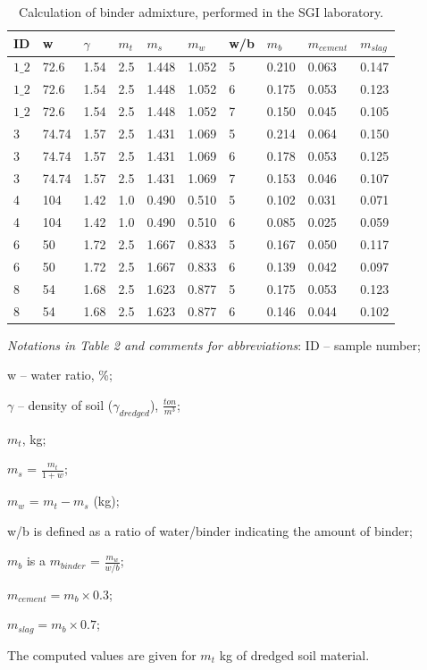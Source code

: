 \documentclass[information,article,submit,pdftex,moreauthors]{Definitions/mdpi}
\begin{document}
\begin{table}[H] 
\begin{threeparttable}
\caption{Calculation of binder admixture, performed in the SGI laboratory.\label{tab02}}
\begin{tabularx}{\textwidth}{CCCCCCCCCC}
\toprule
\textbf{ID} & \textbf{w} & \textbf{$\gamma$} & \textbf{$m_t$} & \textbf{$m_s$} & \textbf{$m_w$} & \textbf{w/b} & \textbf{$m_b$} & \textbf{$m_{cement}$} & \textbf{$m_{slag}$} \\
\midrule
$1\_2$ & 72.6 & 1.54 & 2.5 & 1.448 & 1.052 & 5 & 0.210 & 0.063 & 0.147\\
$1\_2$ & 72.6 & 1.54 & 2.5 & 1.448 & 1.052 & 6 & 0.175 & 0.053 & 0.123\\
$1\_2$ & 72.6 & 1.54 & 2.5 & 1.448 & 1.052 & 7 & 0.150 & 0.045 & 0.105\\
3 & 74.74 & 1.57 & 2.5 & 1.431 & 1.069 & 5 & 0.214 & 0.064 & 0.150\\
3 & 74.74 & 1.57 & 2.5 & 1.431 & 1.069 & 6 & 0.178 & 0.053 & 0.125\\
3 & 74.74 & 1.57 & 2.5 & 1.431 & 1.069 & 7 & 0.153 & 0.046 & 0.107\\
4 & 104 & 1.42 & 1.0 & 0.490 & 0.510 & 5 & 0.102 & 0.031 & 0.071\\
4 & 104 & 1.42 & 1.0 & 0.490 & 0.510 & 6 & 0.085 & 0.025 & 0.059\\
6 & 50 & 1.72 & 2.5 & 1.667 & 0.833 & 5 & 0.167 & 0.050 & 0.117\\
6 & 50 & 1.72 & 2.5 & 1.667 & 0.833 & 6 & 0.139 & 0.042 & 0.097\\
8 & 54 & 1.68 & 2.5 & 1.623 & 0.877 & 5 & 0.175 & 0.053 & 0.123\\
8 & 54 & 1.68 & 2.5 & 1.623 & 0.877 & 6 & 0.146 & 0.044 & 0.102\\
\bottomrule
\end{tabularx}
\begin{tablenotes}
      	\item \emph{Notations in Table 2 and comments for abbreviations}: ID -- sample number; 
	\item w -- water ratio, \%; 
	\item $\gamma$ -- density of soil ($\gamma_{dredged}$), $\frac{ton}{m^3}$; 
	\item $m_t$, kg; 
	\item $m_s$ = $\frac{m_t}{1+w}$; 
	\item $m_w$ = $m_t - m_s$ (kg);
	\item w/b is defined as a ratio of water/binder indicating the amount of binder;
	\item $m_b$ is a $m_{binder}$ = $\frac{m_w}{w/b}$;
	\item $m_{cement} = {m_b}\times 0.3$;
	\item $m_{slag} = {m_b}\times 0.7$;
	\item The computed values are given for $m_t$ kg of dredged soil material.
    \end{tablenotes}
  \end{threeparttable}
\end{table}
\end{document}
